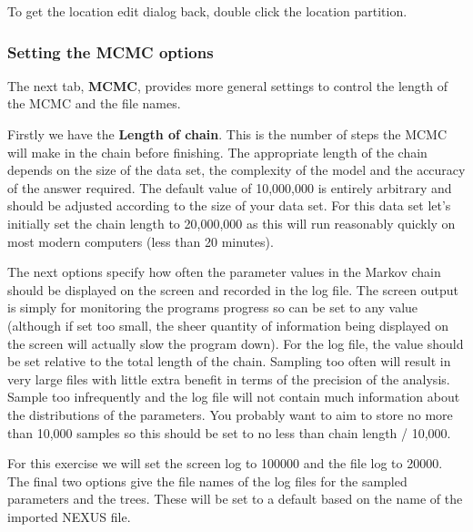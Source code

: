 \documentclass{article}
\begin{document}
To get the location edit dialog back, double click the location partition.


\subsubsection*{Setting the MCMC options }

The next tab, {\bf MCMC}, provides more general
settings to control the length of the MCMC and the file names. 

Firstly we have the \textbf{Length of chain}. This is the number of
steps the MCMC will make in the chain before finishing. The appropriate length of the chain depends on the size of the data set, the complexity of the
model and the accuracy of the answer required. The default value of 10,000,000
is entirely arbitrary and should be adjusted according to the size
of your data set. For this data set let's initially set the chain
length to 20,000,000 as this will run reasonably quickly on most modern
computers (less than 20 minutes).

The next options specify how often the parameter values in the Markov
chain should be displayed on the screen and recorded in the log file.
The screen output is simply for monitoring the programs progress so
can be set to any value (although if set too small, the sheer quantity
of information being displayed on the screen will actually slow the
program down). For the log file, the value should be set relative
to the total length of the chain. Sampling too often will result in
very large files with little extra benefit in terms of the precision
of the analysis. Sample too infrequently and the log file will not
contain much information about the distributions of the parameters. 
You probably want to aim to store no more than 10,000 samples so this should be
set to no less than chain length / 10,000.

For this exercise we will set the screen log to 100000 and the file log to 20000. The final two
options give the file names of the log files for the sampled parameters and
the trees. These will be set to a default based on the name of the
imported NEXUS file. 
\end{document}
